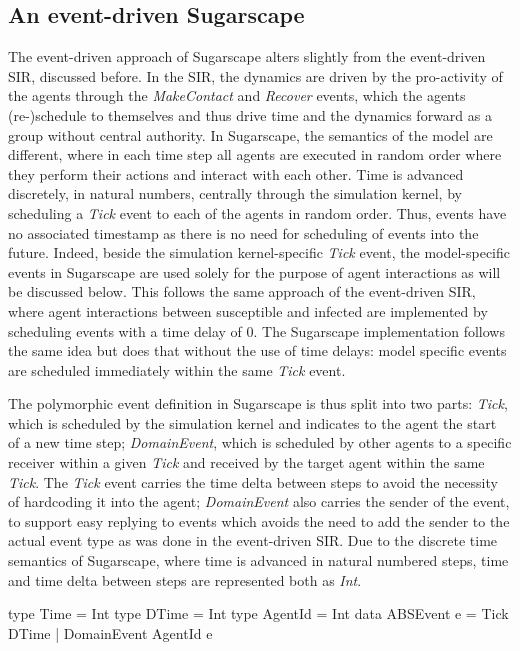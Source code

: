 \subsection{An event-driven Sugarscape}
The event-driven approach of Sugarscape alters slightly from the event-driven SIR, discussed before. In the SIR, the dynamics are driven by the pro-activity of the agents through the \textit{MakeContact} and \textit{Recover} events, which the agents (re-)schedule to themselves and thus drive time and the dynamics forward as a group without central authority. In Sugarscape, the semantics of the model are different, where in each time step all agents are executed in random order where they perform their actions and interact with each other. Time is advanced discretely, in natural numbers, centrally through the simulation kernel, by scheduling a \textit{Tick} event to each of the agents in random order. Thus, events have no associated timestamp as there is no need for scheduling of events into the future. Indeed, beside the simulation kernel-specific \textit{Tick} event, the model-specific events in Sugarscape are used solely for the purpose of agent interactions as will be discussed below. This follows the same approach of the event-driven SIR, where agent interactions between susceptible and infected are implemented by scheduling events with a time delay of 0. The Sugarscape implementation follows the same idea but does that without the use of time delays: model specific events are scheduled immediately within the same \textit{Tick} event.

The polymorphic event definition in Sugarscape is thus split into two parts: \textit{Tick}, which is scheduled by the simulation kernel and indicates to the agent the start of a new time step; \textit{DomainEvent}, which is scheduled by other agents to a specific receiver within a given \textit{Tick} and received by the target agent within the same \textit{Tick}. The \textit{Tick} event carries the time delta between steps to avoid the necessity of hardcoding it into the agent; \textit{DomainEvent} also carries the sender of the event, to support easy replying to events which avoids the need to add the sender to the actual event type as was done in the event-driven SIR. Due to the discrete time semantics of Sugarscape, where time is advanced in natural numbered steps, time and time delta between steps are represented both as \textit{Int}.

\begin{HaskellCode}
type Time       = Int
type DTime      = Int
type AgentId    = Int
data ABSEvent e = Tick DTime 
                | DomainEvent AgentId e
\end{HaskellCode}

